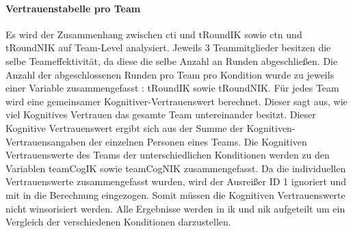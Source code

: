 \documentclass[a4paper,11pt]{article}%
\renewcommand{\\}{\vspace*{0.5\baselineskip} \newline}
\begin{document}
\paragraph{Vertrauenstabelle pro Team}
Es wird der Zusammenhang zwischen \ac{cti} und \ac{tRoundIK} sowie \ac{ctn} und \ac{tRoundNIK} auf Team-Level analysiert.
Jeweils 3 Teammitglieder besitzen die selbe Teameffektivität, da diese die selbe Anzahl an Runden abgeschließen. Die Anzahl der abgeschlossenen Runden pro Team pro Kondition wurde zu jeweils einer Variable zusammengefasst : \ac{tRoundIK} sowie \ac{tRoundNIK}. Für jedes Team wird eine gemeinsamer Kognitiver-Vertrauenswert berechnet. Dieser sagt aus, wie viel Kognitives Vertrauen das gesamte Team untereinander besitzt. Dieser Kognitive Vertrauenswert ergibt sich aus der Summe der Kognitiven-Vertrauensangaben der einzelnen Personen eines Teams. Die Kognitiven Vertrauenswerte des Teams der unterschiedlichen Konditionen werden zu den Variablen \ac{teamCogIK} sowie \ac{teamCogNIK} zusammengefasst.
Da die individuellen Vertrauenswerte zusammengefasst wurden, wird der Ausreißer \dq{}ID 1\dq{} ignoriert und mit in die Berechnung eingezogen. Somit müssen die Kognitiven Vertrauenswerte nicht winsorisiert werden. Alle Ergebnisse werden in \ac{ik} und \ac{nik} aufgeteilt um ein Vergleich der verschiedenen Konditionen darzustellen.
\end{document}
